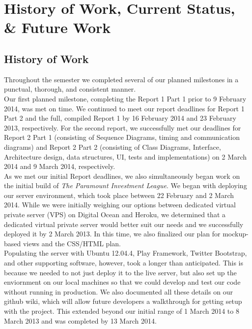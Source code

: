 \chapter{History of Work, Current Status, \& Future Work}

\section{History of Work}

Throughout the semester we completed several of our planned milestones in a
punctual, thorough, and consistent manner.\\

Our first planned milestone, completing the Report 1 Part 1 prior to 9
February 2014, was met on time. We continued to meet our report deadlines for
Report 1 Part 2 and the full, compiled Report 1 by 16 February 2014 and 23
February 2013, respectively. For the second report, we successfully met our
deadlines for Report 2 Part 1 (consisting of Sequence Diagrams, timing and
communication diagrams) and Report 2 Part 2 (consisting of Class Diagrams,
Interface, Architecture design, data structures, UI, tests and implementations)
on 2 March 2014 and 9 March 2014, respectively.\\

As we met our initial Report deadlines, we also simultaneously began work on the
initial build of \textit{The Paramount Investment League}. We began with
deploying our server environment, which took place between 22 February and 2
March 2014. While we were initially weighing our options between dedicated
virtual private server (VPS) on Digital Ocean and Heroku, we determined that
a dedicated virtual private server would better suit our needs and we
successfully deployed it by 2 March 2013. In this time, we also finalized
our plan for mockup-based views and the CSS/HTML plan.\\

Populating the server with Ubuntu 12.04.4, Play Framework, Twitter Bootstrap,
and other supporting software, however, took a longer than anticipated. This is
because we needed to not just deploy it to the live server, but also set up the
enviornment on our local machines so that we could develop and test our code
without running in production. We also documented all these details on our
github wiki, which will allow future developers a walkthrough for getting setup
with the project. This extended beyond our initial range of 1 March 2014 to 8
March 2013 and was completed by 13 March 2014.\\

